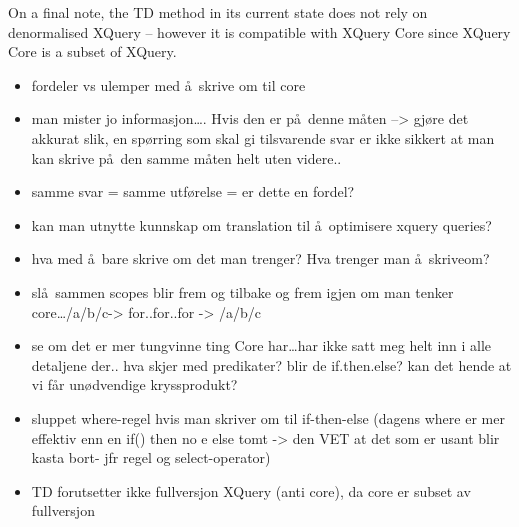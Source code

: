 On a final note, the TD method in its current state does not rely on
denormalised XQuery -- however it is compatible with XQuery Core since XQuery
Core is a subset of XQuery.

\begin{itemize}
  \item fordeler vs ulemper med \aa~skrive om til core
  \item man mister jo informasjon\ldots. Hvis den er p\aa~denne m\aa ten --> gj\o re det akkurat
	  slik, en sp\o rring som skal gi tilsvarende svar er ikke sikkert at man kan
	  skrive p\aa~den samme m\aa ten helt uten videre..  
  \item samme svar = samme utf\o relse = er dette en fordel?
  \item kan man utnytte kunnskap om translation til \aa~optimisere xquery queries?
  \item hva med \aa~bare skrive om det man trenger? Hva trenger man \aa~skriveom?
  \item sl\aa~sammen scopes blir frem og tilbake og frem igjen om man tenker core\ldots /a/b/c-> for..for..for ->
  /a/b/c
  \item se om det er mer tungvinne ting Core har\ldots har ikke satt meg helt inn i alle detaljene der.. hva skjer
  med predikater? blir de if.then.else? kan det hende at vi f\aa r un\o dvendige kryssprodukt?
  \item sluppet where-regel hvis man skriver om til if-then-else (dagens where er mer effektiv enn en if() then no
 e else tomt -> den VET at det som er usant blir kasta bort- jfr regel og select-operator)
 \item TD forutsetter ikke fullversjon XQuery (anti core), da core er subset av fullversjon
\end{itemize}